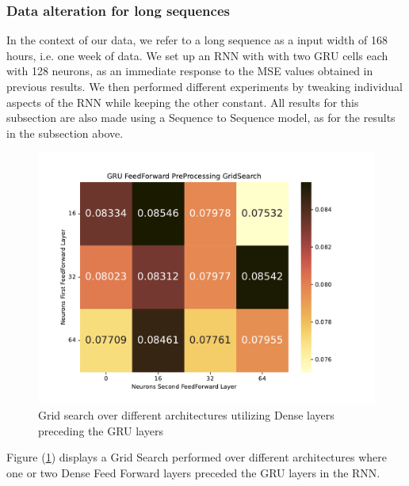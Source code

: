 \documentclass
[twocolumn,
secnumarabic,
nobibnotes,
aps,
prl,
reprint,
groupedaddress,
amsmath,
amssymb,
]{revtex4-2}
\begin{document}
\subsubsection{Data alteration for long sequences}
In the context of our data, we refer to a long sequence as a input width of 168 hours, i.e. one week of data. We set up an RNN with with two GRU cells each with 128 neurons, as an immediate response to the MSE values obtained in previous results. We then performed different experiments by tweaking individual aspects of the RNN while keeping the other constant. All results for this subsection are also made using a Sequence to Sequence model, as for the results in the subsection above.

\begin{figure}
  \includegraphics[width=\columnwidth]{figures/Large_forecast_ff_gridsearch_gru.pdf}
  \caption{\label{fig_gsff}Grid search over different architectures utilizing Dense layers preceding the GRU layers}
\end{figure}

Figure (\ref{fig_gsff}) displays a Grid Search performed over different architectures where one or two Dense Feed Forward layers preceded the GRU layers in the RNN.
\end{document}
